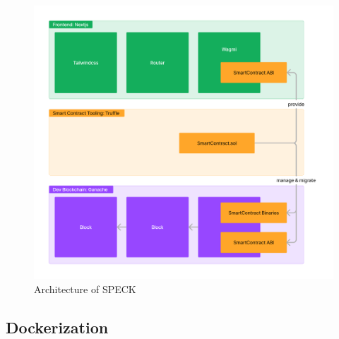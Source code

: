 \documentclass[oneside,a4paper,12pt, colorinlistoftodos]{article} %
\begin{document}
\begin{figure}[bht]
    \centering
    \includegraphics[width=\linewidth]{images/component_structure.pdf}
    \caption{Architecture of SPECK}
    \label{fig:architecture_and_components}
\end{figure}

\subsection{Dockerization}\label{se:dockerization}
\end{document}
